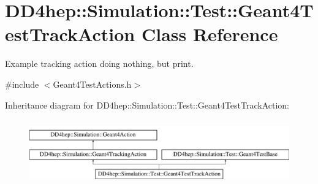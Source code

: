 \hypertarget{class_d_d4hep_1_1_simulation_1_1_test_1_1_geant4_test_track_action}{}\section{D\+D4hep\+:\+:Simulation\+:\+:Test\+:\+:Geant4\+Test\+Track\+Action Class Reference}
\label{class_d_d4hep_1_1_simulation_1_1_test_1_1_geant4_test_track_action}


Example tracking action doing nothing, but print.  




{\ttfamily \#include $<$Geant4\+Test\+Actions.\+h$>$}

Inheritance diagram for D\+D4hep\+:\+:Simulation\+:\+:Test\+:\+:Geant4\+Test\+Track\+Action\+:\begin{figure}[H]
\begin{center}
\leavevmode
\includegraphics[height=2.847458cm]{class_d_d4hep_1_1_simulation_1_1_test_1_1_geant4_test_track_action}
\end{center}
\end{figure}
